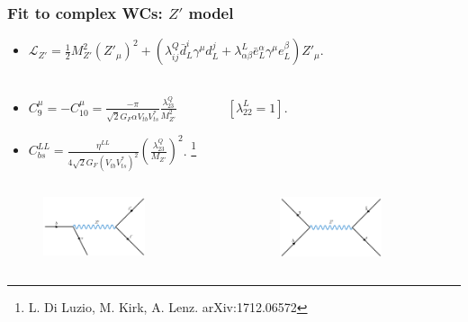\documentclass[mathserif, 10pt]{beamer}
\begin{document}
\begin{frame}\frametitle{Fit to complex WCs: $Z'$ model}
    \begin{itemize}
        \item $\mathcal{L}_{Z'} =  \frac{1}{2} M_{Z'}^2 (Z'_\mu)^2 + (\lambda_{ij}^Q \bar{d}^i_L \gamma^\mu d^j_L + \lambda_{\alpha\beta}^L \bar{e}^\alpha_L \gamma^\mu e_L^\beta )Z'_\mu $.~\\~\\
        \item $C_9^\mu = - C_{10}^\mu = \frac{-\pi}{\sqrt{2} G_F \alpha V_{tb} V_{ts}^*}\frac{\lambda^Q_{23}}{M_{Z'}^2}\qquad\qquad [\lambda^L_{22} = 1]$.
        \item $C_{bs}^{LL} = \frac{\eta^{LL}}{4\sqrt{2}G_F (V_{tb} V_{ts}^*)^2}\left(\frac{\lambda_{23}^Q}{M_{Z'}}\right)^2$. \footnote[4]{L. Di Luzio, M. Kirk, A. Lenz. arXiv:1712.06572}
    \end{itemize}

    \begin{columns}
        \begin{column}[t]{0.48\textwidth}
            \begin{figure}
                \includegraphics[width=0.7\textwidth]{figures/feynZLFUV.png}
            \end{figure}
        \end{column}
        \begin{column}[t]{0.48\textwidth}
            \begin{figure}
                \includegraphics[width=0.7\textwidth]{figures/feynZBs.png}
            \end{figure}
        \end{column}
    \end{columns}
\end{frame}
\end{document}
